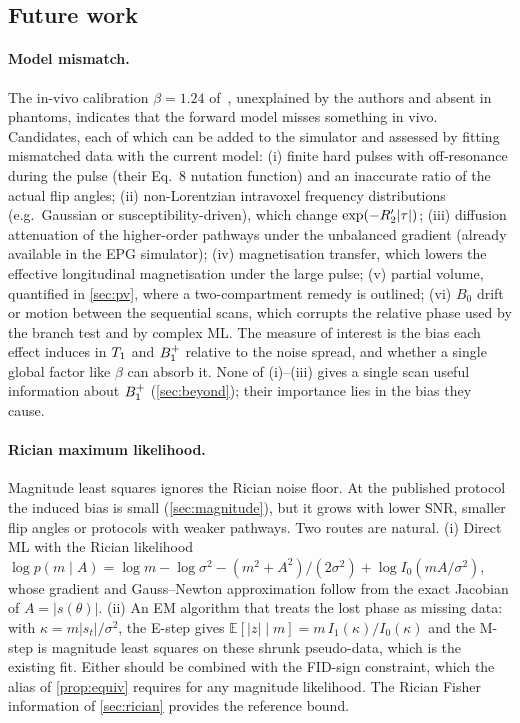 \subsection{Future work}\label{sec:future}

\paragraph{Model mismatch.} The in-vivo calibration $\beta=1.24$ of~\cite{cheng2019}, unexplained by
the authors and absent in phantoms, indicates that the forward model misses something in
vivo. Candidates, each of which can be added to the simulator and assessed by fitting
mismatched data with the current model: (i) finite hard pulses with off-resonance during the
pulse (their Eq.~8 nutation function) and an inaccurate ratio of the actual flip angles; (ii)
non-Lorentzian intravoxel frequency distributions (e.g.\ Gaussian or susceptibility-driven),
which change $\exp(-R_2'|\tau|)$; (iii) diffusion attenuation of the higher-order pathways
under the unbalanced gradient (already available in the EPG simulator); (iv) magnetisation
transfer, which lowers the effective longitudinal magnetisation under the large pulse; (v)
partial volume, quantified in \cref{sec:pv}, where a two-compartment remedy is outlined; (vi) $B_0$ drift or motion between the sequential
scans, which corrupts the relative phase used by the branch test and by complex ML. The
measure of interest is the bias each effect induces in $T_1$ and $B_1^{+}$ relative to the noise
spread, and whether a single global factor like $\beta$ can absorb it. None of (i)--(iii) gives a
single scan useful information about $B_1^{+}$ (\cref{sec:beyond}); their importance lies in the bias
they cause.

\paragraph{Rician maximum likelihood.} Magnitude least squares ignores the Rician noise floor.
At the published protocol the induced bias is small (\cref{sec:magnitude}), but it grows with
lower SNR, smaller flip angles or protocols with weaker pathways. Two routes are natural.
(i) Direct ML with the Rician likelihood
$\log p(m\mid A)=\log m-\log\sigma^2-(m^2+A^2)/(2\sigma^2)+\log I_0(mA/\sigma^2)$, whose gradient and
Gauss--Newton approximation follow from the exact Jacobian of $A=|s(\theta)|$. (ii) An EM algorithm
that treats the lost phase as missing data: with $\kappa=m|s_t|/\sigma^2$, the E-step gives
$\mathbb E[|z|\mid m]=m\,I_1(\kappa)/I_0(\kappa)$ and the M-step is magnitude least squares on these
shrunk pseudo-data, which is the existing fit. Either should be combined with the FID-sign
constraint, which the alias of \cref{prop:equiv} requires for any magnitude likelihood.
The Rician Fisher information of \cref{sec:rician} provides the reference bound.

